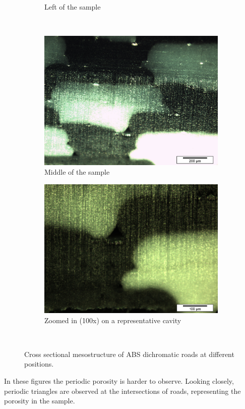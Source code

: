 \begin{figure}
\begin{subfigure}[b]{0.4\textwidth}
    \caption{Left of the sample}
    \label{fig:2}
  \end{subfigure}
  \\
    \begin{subfigure}[b]{0.4\textwidth}
    \includegraphics[width=\textwidth]{chapter_4_RVE_Definition/figures/colored/Tv42_LI.jpg}
    \caption{Middle of the sample}
    \label{fig:3}
  \end{subfigure}
  \begin{subfigure}[b]{0.4\textwidth}
    \includegraphics[width=\textwidth]{chapter_4_RVE_Definition/figures/colored/Tv86a_LI.jpg}
    \caption{Zoomed in (100x) on a representative cavity}
    \label{fig:4}
  \end{subfigure}
  \\
  
  \caption{Cross sectional mesostructure of ABS dichromatic roads at different positions.}
    \label{fig:coloredroads}
\end{figure}
In these figures the periodic porosity is harder to observe. Looking closely, periodic triangles are observed at the intersections of roads, representing the porosity in the sample.

